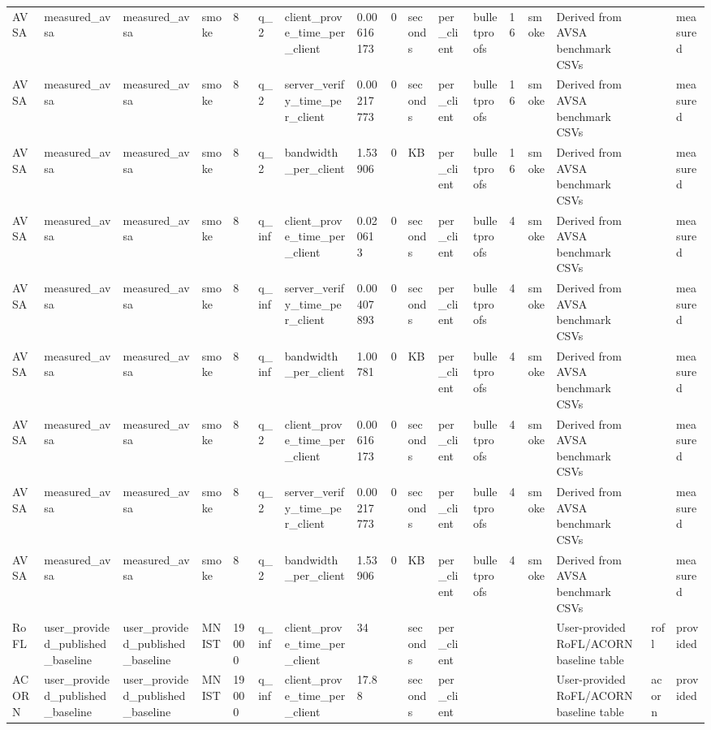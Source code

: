 \begin{table}[t]
\begin{tabular}{lllllllllllllllll}
AVSA & measured\_avsa & measured\_avsa & smoke & 8 & q\_2 & client\_prove\_time\_per\_client & 0.00616173 & 0 & seconds & per\_client & bulletproofs & 16 & smoke & Derived from AVSA benchmark CSVs &  & measured \\
AVSA & measured\_avsa & measured\_avsa & smoke & 8 & q\_2 & server\_verify\_time\_per\_client & 0.00217773 & 0 & seconds & per\_client & bulletproofs & 16 & smoke & Derived from AVSA benchmark CSVs &  & measured \\
AVSA & measured\_avsa & measured\_avsa & smoke & 8 & q\_2 & bandwidth\_per\_client & 1.53906 & 0 & KB & per\_client & bulletproofs & 16 & smoke & Derived from AVSA benchmark CSVs &  & measured \\
AVSA & measured\_avsa & measured\_avsa & smoke & 8 & q\_inf & client\_prove\_time\_per\_client & 0.020613 & 0 & seconds & per\_client & bulletproofs & 4 & smoke & Derived from AVSA benchmark CSVs &  & measured \\
AVSA & measured\_avsa & measured\_avsa & smoke & 8 & q\_inf & server\_verify\_time\_per\_client & 0.00407893 & 0 & seconds & per\_client & bulletproofs & 4 & smoke & Derived from AVSA benchmark CSVs &  & measured \\
AVSA & measured\_avsa & measured\_avsa & smoke & 8 & q\_inf & bandwidth\_per\_client & 1.00781 & 0 & KB & per\_client & bulletproofs & 4 & smoke & Derived from AVSA benchmark CSVs &  & measured \\
AVSA & measured\_avsa & measured\_avsa & smoke & 8 & q\_2 & client\_prove\_time\_per\_client & 0.00616173 & 0 & seconds & per\_client & bulletproofs & 4 & smoke & Derived from AVSA benchmark CSVs &  & measured \\
AVSA & measured\_avsa & measured\_avsa & smoke & 8 & q\_2 & server\_verify\_time\_per\_client & 0.00217773 & 0 & seconds & per\_client & bulletproofs & 4 & smoke & Derived from AVSA benchmark CSVs &  & measured \\
AVSA & measured\_avsa & measured\_avsa & smoke & 8 & q\_2 & bandwidth\_per\_client & 1.53906 & 0 & KB & per\_client & bulletproofs & 4 & smoke & Derived from AVSA benchmark CSVs &  & measured \\
RoFL & user\_provided\_published\_baseline & user\_provided\_published\_baseline & MNIST & 19000 & q\_inf & client\_prove\_time\_per\_client & 34 &  & seconds & per\_client &  &  &  & User-provided RoFL/ACORN baseline table & rofl & provided \\
ACORN & user\_provided\_published\_baseline & user\_provided\_published\_baseline & MNIST & 19000 & q\_inf & client\_prove\_time\_per\_client & 17.88 &  & seconds & per\_client &  &  &  & User-provided RoFL/ACORN baseline table & acorn & provided \\

\end{tabular}
\end{table}
